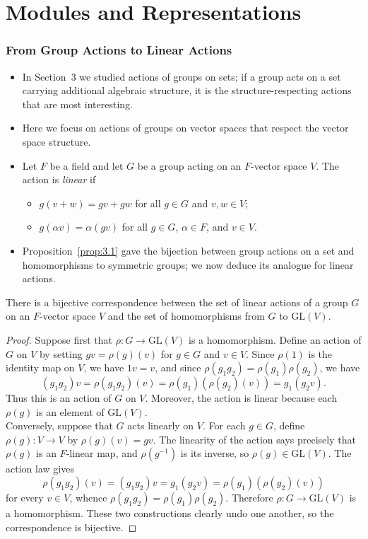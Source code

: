 \documentclass[../Odyssey_Project.tex]{subfiles}
\begin{document}
\setcounter{section}{11}
\section{Modules and Representations}

\subsubsection*{From Group Actions to Linear Actions}
\begin{itemize}
    \item In Section~3 we studied actions of groups on sets; if a group acts on a set carrying additional algebraic structure, it is the structure-respecting actions that are most interesting.
    \item Here we focus on actions of groups on vector spaces that respect the vector space structure.
    \item Let $F$ be a field and let $G$ be a group acting on an $F$-vector space $V$. The action is \emph{linear} if
    \begin{itemize}
        \item $g(v + w) = gv + gw$ for all $g \in G$ and $v, w \in V$;
        \item $g(\alpha v) = \alpha(gv)$ for all $g \in G$, $\alpha \in F$, and $v \in V$.
    \end{itemize}
    \item Proposition~\ref{prop:3.1} gave the bijection between group actions on a set and homomorphisms to symmetric groups; we now deduce its analogue for linear actions.
\end{itemize}

\begin{proposition}
\label{prop:12.1}
There is a bijective correspondence between the set of linear actions of a group $G$ on an $F$-vector space $V$ and the set of homomorphisms from $G$ to $\mathrm{GL}(V)$.
\end{proposition}
\begin{proof}
    Suppose first that $\rho \colon G \to \mathrm{GL}(V)$ is a homomorphism. Define an action of $G$ on $V$ by setting $gv = \rho(g)(v)$ for $g \in G$ and $v \in V$. Since $\rho(1)$ is the identity map on $V$, we have $1v = v$, and since $\rho(g_1g_2) = \rho(g_1)\rho(g_2)$, we have
    \[
        (g_1g_2)v = \rho(g_1g_2)(v) = \rho(g_1)(\rho(g_2)(v)) = g_1(g_2v).
    \]
    Thus this is an action of $G$ on $V$. Moreover, the action is linear because each $\rho(g)$ is an element of $\mathrm{GL}(V)$.\\
    Conversely, suppose that $G$ acts linearly on $V$. For each $g \in G$, define $\rho(g) \colon V \to V$ by $\rho(g)(v) = gv$. The linearity of the action says precisely that $\rho(g)$ is an $F$-linear map, and $\rho(g^{-1})$ is its inverse, so $\rho(g) \in \mathrm{GL}(V)$. The action law gives
    \[
        \rho(g_1g_2)(v) = (g_1g_2)v = g_1(g_2v) = \rho(g_1)(\rho(g_2)(v))
    \]
    for every $v \in V$, whence $\rho(g_1g_2) = \rho(g_1)\rho(g_2)$. Therefore $\rho \colon G \to \mathrm{GL}(V)$ is a homomorphism. These two constructions clearly undo one another, so the correspondence is bijective.
\end{proof}
\end{document}

